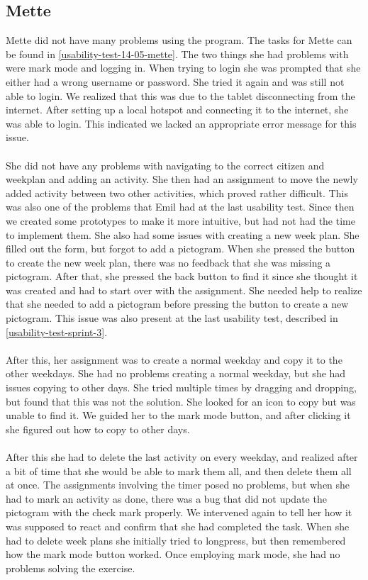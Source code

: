 \subsection{Mette}
Mette did not have many problems using the program.
The tasks for Mette can be found in \autoref{usability-test-14-05-mette}.
The two things she had problems with were mark mode and logging in.
When trying to login she was prompted that she either had a wrong username or password. 
She tried it again and was still not able to login.
We realized that this was due to the tablet disconnecting from the internet.
After setting up a local hotspot and connecting it to the internet, she was able to login.
This indicated we lacked an appropriate error message for this issue.
\\\\
She did not have any problems with navigating to the correct citizen and weekplan and adding an activity.
She then had an assignment to move the newly added activity between two other activities, which proved rather difficult. 
This was also one of the problems that Emil had at the last usability test.
Since then we created some prototypes to make it more intuitive, but had not had the time to implement them.
She also had some issues with creating a new week plan.
She filled out the form, but forgot to add a pictogram. 
When she pressed the button to create the new week plan, there was no feedback that she was missing a pictogram.
After that, she pressed the back button to find it since she thought it was created and had to start over with the assignment. 
She needed help to realize that she needed to add a pictogram before pressing the button to create a new pictogram.
This issue was also present at the last usability test, described in \autoref{usability-test-sprint-3}.
\\\\
After this, her assignment was to create a normal weekday and copy it to the other weekdays.
She had no problems creating a normal weekday, but she had issues copying to other days.
She tried multiple times by dragging and dropping, but found that this was not the solution. She looked for an icon to copy but was unable to find it. 
We guided her to the mark mode button, and after clicking it she figured out how to copy to other days.
\\\\
After this she had to delete the last activity on every weekday, and realized after a bit of time that she would be able to mark them all, and then delete them all at once.
The assignments involving the timer posed no problems, but when she had to mark an activity as done, there was a bug that did not update the pictogram with the check mark properly. 
We intervened again to tell her how it was supposed to react and confirm that she had completed the task.
When she had to delete week plans she initially tried to longpress, but then remembered how the mark mode button worked. 
Once employing mark mode, she had no problems solving the exercise.

